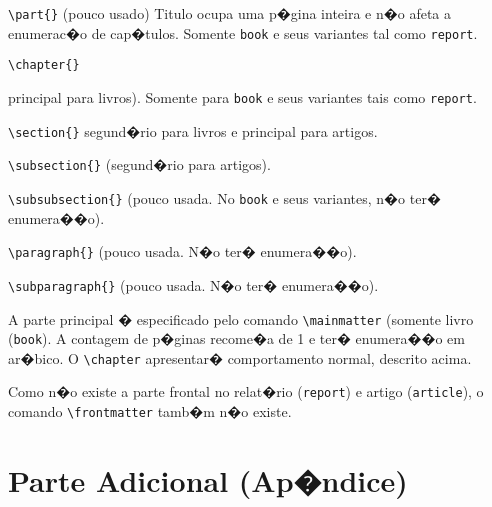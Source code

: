 \documentclass[12pt,a4paper,oneside, openany, titlepage]{book}
\begin{document}
\verb+\part{}+ (pouco usado) Titulo ocupa uma p�gina inteira e 
n�o afeta a enumerac�o de cap�tulos. 
Somente \texttt{book} e seus variantes tal como \texttt{report}.

\verb+\chapter{}+ {principal para livros). Somente para \texttt{book} 
e seus variantes tais como \texttt{report}.

\verb+\section{}+ {segund�rio para livros e principal para artigos}.

\verb+\subsection{}+ (segund�rio para artigos).

\verb+\subsubsection{}+ (pouco usada. No \texttt{book} e seus variantes, n�o ter� enumera��o).

\verb+\paragraph{}+ (pouco usada. N�o ter� enumera��o).

\verb+\subparagraph{}+ (pouco usada. N�o ter� enumera��o).

A parte principal � especificado pelo comando \verb+\mainmatter+ 
(somente livro (\texttt{book}). 
A contagem de p�ginas recome�a de 1 e ter� enumera��o em ar�bico. 
O \verb+\chapter+ apresentar� comportamento normal, descrito acima.

Como n�o existe a parte frontal no relat�rio (\texttt{report}) e artigo (\texttt{article}), o comando
\verb+\frontmatter+ tamb�m n�o existe.

\chapter{Parte Adicional (Ap�ndice)}  \label{chap:appendix}

}
\end{document}
